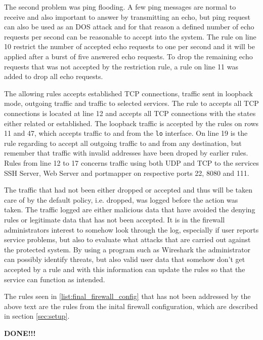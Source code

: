 The second problem was ping flooding. A few ping messages are normal to receive and also important to answer by transmitting an echo, but ping request can also be used as an DOS attack and for that reason a defined number of echo requests per second can be reasonable to accept into the system. The rule on line 10 restrict the number of accepted echo requests to one per second and it will be applied after a burst of five answered echo requests. To drop the remaining echo requests that was not accepted by the restriction rule, a rule on line 11 was added to drop all echo requests.

The allowing rules accepts established TCP connections, traffic sent in loopback mode, outgoing traffic and traffic to selected services. The rule to accepts all TCP connections is located at line 12 and accepts all TCP connections with the states either related or established. The loopback traffic is accepted by the rules on rows 11 and 47, which accepts traffic to and from the \texttt{lo} interface. On line 19 is the rule regarding to accept all outgoing traffic to and from any destination, but remember that traffic with invalid addresses have been droped by earlier rules. Rules from line 12 to 17 concerns traffic using both UDP and TCP to the services SSH Server, Web Server and portmapper on respective ports 22, 8080 and 111.

The traffic that had not been either dropped or accepted and thus will be taken care of by the default policy, i.e. dropped, was logged before the action was taken. The traffic logged are either malicious data that have avoided the denying rules or legitimate data that has not been accepted. It is in the firewall administrators interest to somehow look through the log, especially if user reports service problems, but also to evaluate what attacks that are carried out against the protected system. By using a program such as Wireshark the administrator can possibly identify threats, but also valid user data that somehow don't get accepted by a rule and with this information can update the rules so that the service can function as intended. 

The rules seen in \ref{list:final_firewall_config} that has not been addressed by the above text are the rules from the inital firewall configuration, which are described in section \ref{sec:setup}.


\textbf{DONE!!!}

\label{list:final_firewall_config}